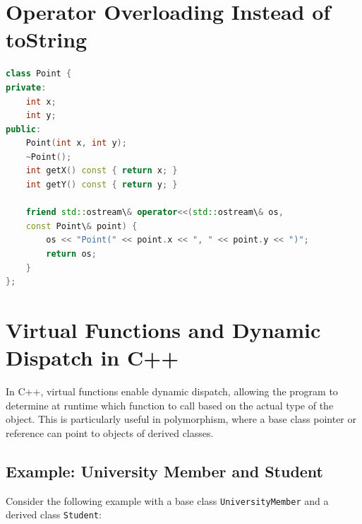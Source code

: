\documentclass{report}
\begin{document}
\section*{Operator Overloading Instead of toString}

\begin{lstlisting}[language=C++]
class Point {
private:
	int x;
	int y;
public:
	Point(int x, int y);
	~Point();
	int getX() const { return x; }
	int getY() const { return y; }
	
	friend std::ostream\& operator<<(std::ostream\& os, 
	const Point\& point) {
		os << "Point(" << point.x << ", " << point.y << ")";
		return os;
	}
};
	\end{lstlisting}



\section{Virtual Functions and Dynamic Dispatch in C++}

In C++, virtual functions enable dynamic dispatch, allowing the program to determine at runtime which function to call based on the actual type of the object. This is particularly useful in polymorphism, where a base class pointer or reference can point to objects of derived classes.

\subsection{Example: University Member and Student}

Consider the following example with a base class \texttt{UniversityMember} and a derived class \texttt{Student}:
\end{document}
